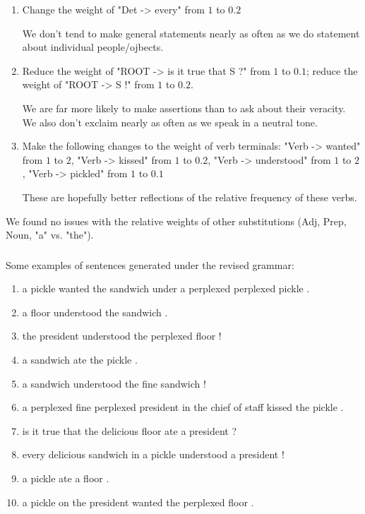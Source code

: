 \documentclass[11pt]{article}
\begin{document}
\begin{enumerate}[label=(\arabic*)]
      \item Change the weight of "Det -> every" from $1$ to $0.2$

            We don't tend to make general statements nearly as often as we do statement about individual people/ojbects.

      \item Reduce the weight of "ROOT -> is it true that S ?" from $1$ to $0.1$; reduce the weight of "ROOT -> S !" from $1$ to $0.2$.

            We are far more likely to make assertions than to ask about their veracity. We also don't exclaim nearly as often as we speak in a neutral tone.

      \item Make the following changes to the weight of verb terminals: "Verb -> wanted" from $1$ to $2$, "Verb -> kissed" from $1$ to $0.2$, "Verb -> understood" from $1$ to $2$, "Verb -> pickled" from $1$ to $0.1$

            These are hopefully better reflections of the relative frequency of these verbs.
\end{enumerate}

\noindent We found no issues with the relative weights of other substitutions (Adj, Prep, Noun, "a" vs. "the").

\subsubsection{}

\noindent Some examples of sentences generated under the revised grammar:

\begin{enumerate}[label=(\arabic*)]
      \item a pickle wanted the sandwich under a perplexed perplexed pickle .
      \item a floor understood the sandwich .
      \item the president understood the perplexed floor !
      \item a sandwich ate the pickle .
      \item a sandwich understood the fine sandwich !
      \item a perplexed fine perplexed president in the chief of staff kissed the pickle .
      \item is it true that the delicious floor ate a president ?
      \item every delicious sandwich in a pickle understood a president !
      \item a pickle ate a floor .
      \item a pickle on the president wanted the perplexed floor .
\end{enumerate}
\end{document}
